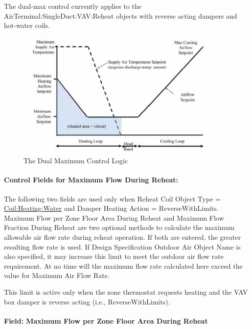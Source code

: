 The dual-max control currently applies to the AirTerminal:SingleDuct:VAV:Reheat objects with reverse acting dampers and hot-water coils.

\begin{figure}[hbtp] %
\centering
\includegraphics[width=0.9\textwidth, height=0.9\textheight, keepaspectratio=true]{media/image265.png}
\caption{  The Dual Maximum Control Logic \protect \label{fig:the-dual-maximum-control-logic}}
\end{figure}

\paragraph{Control Fields for Maximum Flow During Reheat:}\label{control-fields-for-maximum-flow-during-reheat}

The following two fields are used only when Reheat Coil Object Type = \hyperref[coilheatingwater]{Coil:Heating:Water} and Damper Heating Action = ReverseWithLimits. Maximum Flow per Zone Floor Area During Reheat and Maximum Flow Fraction During Reheat are two optional methods to calculate the maximum allowable air flow rate during reheat operation. If both are entered, the greater resulting flow rate is used. If Design Specification Outdoor Air Object Name is also specified, it may increase this limit to meet the outdoor air flow rate requirement. At no time will the maximum flow rate calculated here exceed the value for Maximum Air Flow Rate.

This limit is active only when the zone thermostat requests heating and the VAV box damper is reverse acting (i.e., ReverseWithLimits).

\paragraph{Field: Maximum Flow per Zone Floor Area During Reheat}\label{field-maximum-flow-per-zone-floor-area-during-reheat}

